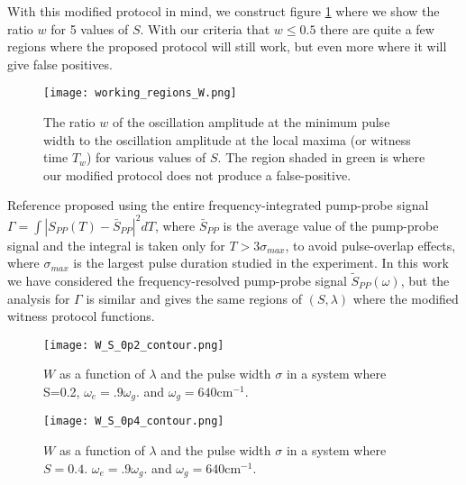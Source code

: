 With this modified protocol in mind, we construct figure \ref{fig:working_regions_W} where we show the ratio $w$ for 5 values of $S$.  With our criteria that $w \leq 0.5$ there are quite a few regions where the proposed protocol will still work, but even more where it will give false positives.

\begin{figure}
   \texttt{[image: working\_regions\_W.png]}
   \caption{The ratio $w$ of the oscillation amplitude at the minimum pulse width to the oscillation amplitude at the local maxima (or witness time $T_w$) for various values of $S$.  The region shaded in green is where our modified protocol does not produce a false-positive. }
	\label{fig:working_regions_W}
\end{figure}

Reference \cite{allanWitness} proposed using the entire frequency-integrated pump-probe signal $\Gamma=\int |S_{PP}(T)-\bar{S}_{PP}|^2 dT$, where $\bar{S}_{PP}$ is the average value of the pump-probe signal and the integral is taken only for $T>3\sigma_{max}$, to avoid pulse-overlap effects, where $\sigma_{max}$ is the largest pulse duration studied in the experiment. In this work we have considered the frequency-resolved pump-probe signal $\tilde{S}_{PP}(\omega)$, but the analysis for $\Gamma$ is similar and gives the same regions of $(S,\lambda)$ where the modified witness protocol functions.

\begin{figure}
   \texttt{[image: W\_S\_0p2\_contour.png]}
   \caption{$W$ as a function of $\lambda$ and the pulse width $\sigma$ in a system where S=0.2, $\omega_e = .9 \omega_g$. and $\omega_g = 640 \text{cm}^{-1}$.  }
	\label{fig:s_0p2}
\end{figure}

\begin{figure}
   \texttt{[image: W\_S\_0p4\_contour.png]}
   \caption{$W$ as a function of $\lambda$ and the pulse width $\sigma$ in a system where $S=0.4$. $\omega_e = .9 \omega_g$. and $\omega_g = 640 \text{cm}^{-1}$.}
	\label{fig:s_0p4}
\end{figure}

